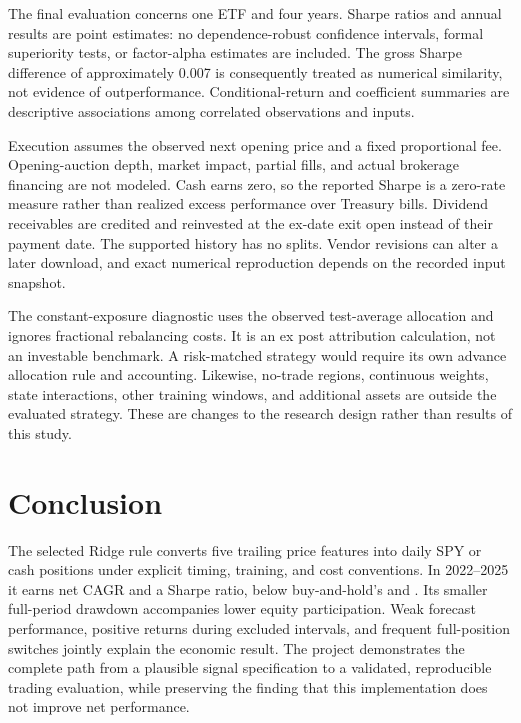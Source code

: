 The final evaluation concerns one ETF and four years. Sharpe ratios and annual results are point estimates: no dependence-robust confidence intervals, formal superiority tests, or factor-alpha estimates are included. The gross Sharpe difference of approximately 0.007 is consequently treated as numerical similarity, not evidence of outperformance. Conditional-return and coefficient summaries are descriptive associations among correlated observations and inputs.

Execution assumes the observed next opening price and a fixed proportional fee. Opening-auction depth, market impact, partial fills, and actual brokerage financing are not modeled. Cash earns zero, so the reported Sharpe is a zero-rate measure rather than realized excess performance over Treasury bills. Dividend receivables are credited and reinvested at the ex-date exit open instead of their payment date. The supported history has no splits. Vendor revisions can alter a later download, and exact numerical reproduction depends on the recorded input snapshot.

The constant-exposure diagnostic uses the observed test-average allocation and ignores fractional rebalancing costs. It is an ex post attribution calculation, not an investable benchmark. A risk-matched strategy would require its own advance allocation rule and accounting. Likewise, no-trade regions, continuous weights, state interactions, other training windows, and additional assets are outside the evaluated strategy. These are changes to the research design rather than results of this study.

\section{Conclusion}
\label{sec:conclusion}
The selected Ridge rule converts five trailing price features into daily SPY or cash positions under explicit timing, training, and cost conventions. In 2022--2025 it earns \RidgeCAGR{} net CAGR and a \RidgeSharpe{} Sharpe ratio, below buy-and-hold's \BHCAGR{} and \BHSharpe{}. Its smaller full-period drawdown accompanies lower equity participation. Weak forecast performance, positive returns during excluded intervals, and frequent full-position switches jointly explain the economic result. The project demonstrates the complete path from a plausible signal specification to a validated, reproducible trading evaluation, while preserving the finding that this implementation does not improve net performance.

